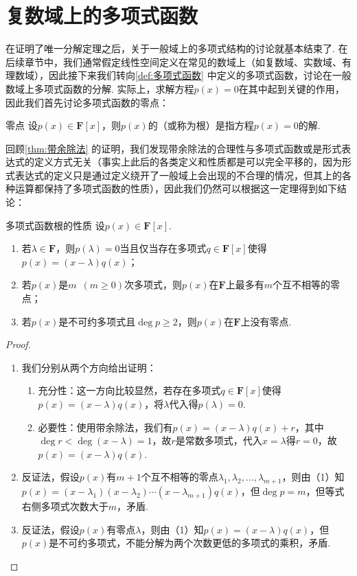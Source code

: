 \section{复数域上的多项式函数}
在证明了唯一分解定理之后，关于一般域上的多项式结构的讨论就基本结束了. 在后续章节中，我们通常假定线性空间定义在常见的数域上（如复数域、实数域、有理数域），因此接下来我们转向\autoref{def:多项式函数} 中定义的多项式函数，讨论在一般数域上多项式函数的分解. 实际上，求解方程$p(x)=0$在其中起到关键的作用，因此我们首先讨论多项式函数的零点：
\begin{definition}{零点}{}
    设$p(x)\in\mathbf{F}[x]$，则$p(x)$的（或称为根）是指方程$p(x)=0$的解.
\end{definition}

回顾\autoref{thm:带余除法} 的证明，我们发现带余除法的合理性与多项式函数或是形式表达式的定义方式无关（事实上此后的各类定义和性质都是可以完全平移的，因为形式表达式的定义只是通过定义绕开了一般域上会出现的不合理的情况，但其上的各种运算都保持了多项式函数的性质），因此我们仍然可以根据这一定理得到如下结论：
\begin{theorem}{}{多项式函数根的性质}
    设$p(x)\in\mathbf{F}[x]$.
    \begin{enumerate}
        \item 若$\lambda\in\mathbf{F}$，则$p(\lambda)=0$当且仅当存在多项式$q\in\mathbf{F}[x]$使得$p(x)=(x-\lambda)q(x)$；
        \item 若$p(x)$是$m\enspace(m \geqslant 0)$次多项式，则$p(x)$在$\mathbf{F}$上最多有$m$个互不相等的零点；
        \item 若$p(x)$是不可约多项式且$\deg p\geqslant 2$，则$p(x)$在$\mathbf{F}$上没有零点.
    \end{enumerate}
\end{theorem}
\begin{proof}
    \begin{enumerate}
        \item 我们分别从两个方向给出证明：
              \begin{enumerate}
                  \item 充分性：这一方向比较显然，若存在多项式$q\in\mathbf{F}[x]$使得$p(x)=(x-\lambda)q(x)$，将$\lambda$代入得$p(\lambda)=0$.
                  \item 必要性：使用带余除法，我们有$p(x)=(x-\lambda)q(x)+r$，其中$\deg r<\deg(x-\lambda)=1$，故$r$是常数多项式，代入$x=\lambda$得$r=0$，故$p(x)=(x-\lambda)q(x)$.
              \end{enumerate}
        \item 反证法，假设$p(x)$有$m+1$个互不相等的零点$\lambda_1,\lambda_2,\ldots,\lambda_{m+1}$，则由（1）知$p(x)=(x-\lambda_1)(x-\lambda_2)\cdots(x-\lambda_{m+1})q(x)$，但$\deg p=m$，但等式右侧多项式次数大于$m$，矛盾.
        \item 反证法，假设$p(x)$有零点$\lambda$，则由（1）知$p(x)=(x-\lambda)q(x)$，但$p(x)$是不可约多项式，不能分解为两个次数更低的多项式的乘积，矛盾.
    \end{enumerate}
\end{proof}

